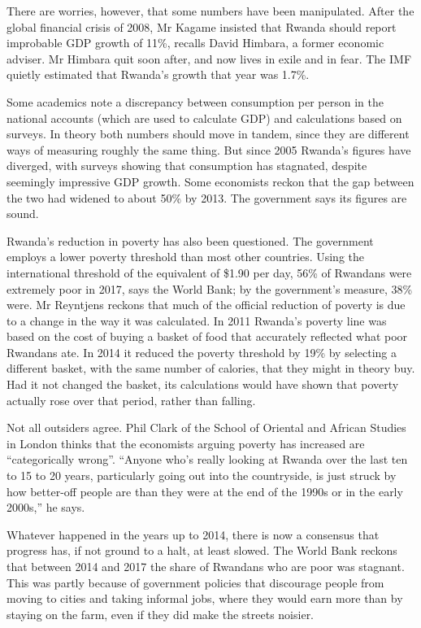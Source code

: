 \documentclass{article}
\begin{document}
There are worries, however, that some numbers have been manipulated. After the global financial crisis of 2008, Mr Kagame insisted that Rwanda should report improbable GDP growth of 11\%, recalls David Himbara, a former economic adviser. Mr Himbara quit soon after, and now lives in exile and in fear. The IMF quietly estimated that Rwanda's growth that year was 1.7\%. 

Some academics note a discrepancy between consumption per person in the national accounts (which are used to calculate GDP) and calculations based on surveys. In theory both numbers should move in tandem, since they are different ways of measuring roughly the same thing. But since 2005 Rwanda's figures have diverged, with surveys showing that consumption has stagnated, despite seemingly impressive GDP growth. Some economists reckon that the gap between the two had widened to about 50\% by 2013. The government says its figures are sound. 

Rwanda's reduction in poverty has also been questioned. The government employs a lower poverty threshold than most other countries. Using the international threshold of the equivalent of \$1.90 per day, 56\% of Rwandans were extremely poor in 2017, says the World Bank; by the government's measure, 38\% were. Mr Reyntjens reckons that much of the official reduction of poverty is due to a change in the way it was calculated. In 2011 Rwanda's poverty line was based on the cost of buying a basket of food that accurately reflected what poor Rwandans ate. In 2014 it reduced the poverty threshold by 19\% by selecting a different basket, with the same number of calories, that they might in theory buy. Had it not changed the basket, its calculations would have shown that poverty actually rose over that period, rather than falling. 

Not all outsiders agree. Phil Clark of the School of Oriental and African Studies in London thinks that the economists arguing poverty has increased are ``categorically wrong''. ``Anyone who's really looking at Rwanda over the last ten to 15 to 20 years, particularly going out into the countryside, is just struck by how better-off people are than they were at the end of the 1990s or in the early 2000s,'' he says. 

Whatever happened in the years up to 2014, there is now a consensus that progress has, if not ground to a halt, at least slowed. The World Bank reckons that between 2014 and 2017 the share of Rwandans who are poor was stagnant. This was partly because of government policies that discourage people from moving to cities and taking informal jobs, where they would earn more than by staying on the farm, even if they did make the streets noisier. 
\end{document}
